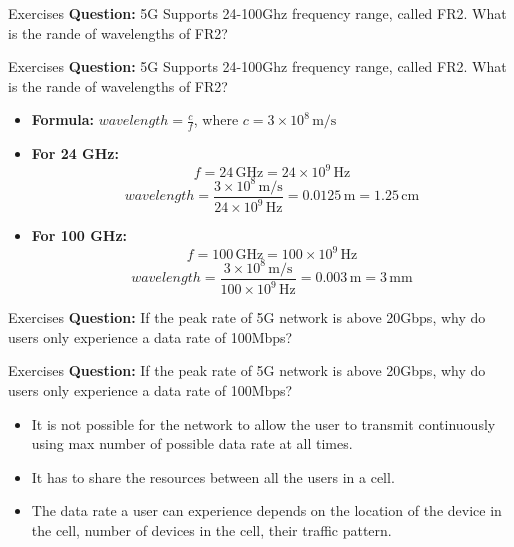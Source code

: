 \documentclass{beamer}
\begin{document}
\begin{frame}{Exercises}
  \textbf{Question:} 5G Supports 24-100Ghz frequency range, called FR2. What is the rande of wavelengths of FR2?
\end{frame}


\begin{frame}{Exercises}
  \textbf{Question:} 5G Supports 24-100Ghz frequency range, called FR2. What is the rande of wavelengths of FR2?
  \vspace*{0.75em}
  \begin{itemize}
    \item \textbf{Formula:} \(wavelength = \frac{c}{f}\), where \(c = 3 \times 10^8 \, \text{m/s}\)
    \item \textbf{For 24 GHz:}
    \[
    f = 24 \, \text{GHz} = 24 \times 10^9 \, \text{Hz}
    \]
    \[
      wavelength = \frac{3 \times 10^8 \, \text{m/s}}{24 \times 10^9 \, \text{Hz}} = 0.0125 \, \text{m} = 1.25 \, \text{cm}
    \]
    \item \textbf{For 100 GHz:}
    \[
    f = 100 \, \text{GHz} = 100 \times 10^9 \, \text{Hz}
    \]
    \[
      wavelength = \frac{3 \times 10^8 \, \text{m/s}}{100 \times 10^9 \, \text{Hz}} = 0.003 \, \text{m} = 3 \, \text{mm}
    \]
  \end{itemize}
\end{frame}

\begin{frame}{Exercises}
  \textbf{Question:} If the peak rate of 5G network is above 20Gbps, why do users only experience a data rate of 100Mbps?
\end{frame}


\begin{frame}{Exercises}
  \textbf{Question:} If the peak rate of 5G network is above 20Gbps, why do users only experience a data rate of 100Mbps?
  \vspace*{0.75em}
  \begin{itemize}
    \item It is not possible for the network to allow the user to transmit continuously using max number of possible data rate at all times.
    \item It has to share the resources between all the users in a cell.
    \item The data rate a user can experience depends on the location of the device in the cell, number of devices in the cell, their traffic pattern.
  \end{itemize}
\end{frame}
\end{document}

